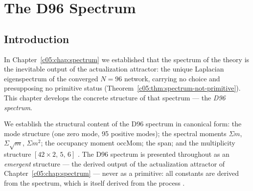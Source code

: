 %
%


\chapter{The D96 Spectrum}
\label{c06:chap:d96}

\section{Introduction}
\label{c06:sec:d96-introduction}

In Chapter~\ref{c05:chap:spectrum} we established that the spectrum of the theory is the
inevitable output of the actualization attractor: the unique Laplacian eigenspectrum of the
converged $N=96$ network, carrying no choice and presupposing no primitive status
(Theorem~\ref{c05:thm:spectrum-not-primitive}). This chapter
develops the concrete structure of that spectrum --- the \emph{D96 spectrum}.

We establish the structural content of the D96 spectrum in canonical form: the mode structure
(one zero mode, 95 positive modes); the spectral moments $\Sigma m$,
$\Sigma\sqrt{m}$, $\Sigma m^2$; the occupancy moment $\mathrm{occMom}$; the span; and the
multiplicity structure $[42\times2,\,5,\,6]$ \cite{c06:QG155,c06:QG156,c06:QG157,c06:QG158}. The D96 spectrum is
presented throughout as an \emph{emergent} structure --- the derived output of the
actualization attractor of Chapter~\ref{c05:chap:spectrum} --- never as a primitive: all
constants are derived from the spectrum, which is itself derived from the process
\cite{c06:QG159,c06:QG295}.

